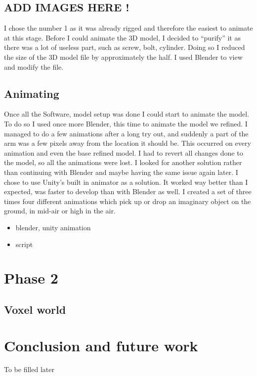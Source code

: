 \documentclass{scrartcl}
\begin{document}
\subsection{ADD IMAGES HERE !}
I chose the number 1 as it was already rigged and therefore the easiest to animate at this stage. 
Before I could animate the 3D model, I decided to “purify” it as there was a lot of useless part, such as screw, bolt, cylinder. 
Doing so I reduced the size of the 3D model file by approximately the half. I used Blender to view and modify the file.

\subsection{Animating}
Once all the Software, model setup was done I could start to animate the model. To do so I used once more Blender, 
this time to animate the model we refined. I managed to do a few animations after a long try out, 
and suddenly a part of the arm was a few pixels away from the location it should be. This occurred on every animation and even the base refined model. 
I had to revert all changes done to the model, so all the animations were lost. I looked for another solution rather than continuing with Blender 
and maybe having the same issue again later. I chose to use Unity’s built in animator as a solution. 
It worked way better than I expected, was faster to develop than with Blender as well. I created a set of three times four different animations 
which pick up or drop an imaginary object on the ground, in mid-air or high in the air. 
\begin{itemize}
  \item blender, unity animation
  \item script
\end{itemize}

\clearpage

\section{Phase 2}
\subsection{Voxel world}

\clearpage

\section{Conclusion and future work}
To be filled later


\printbibliography[heading=bibintoc]
\end{document}
